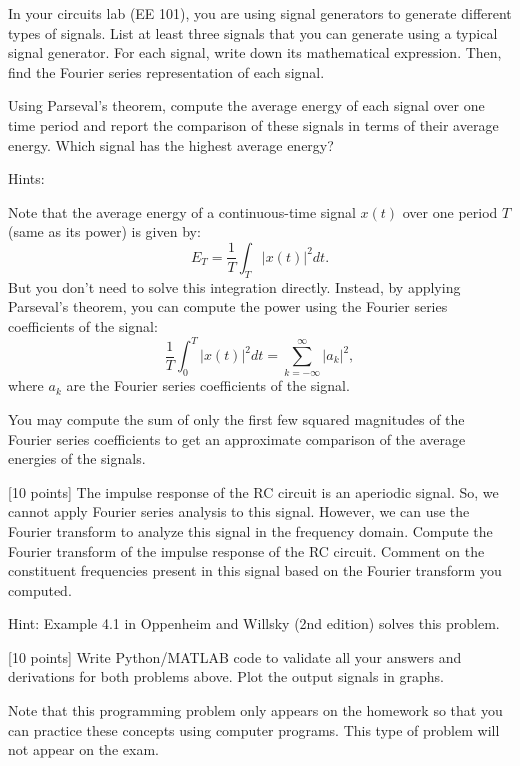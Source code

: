 \documentclass{ee102_pset}
\begin{document}
In your circuits lab (EE 101), you are using signal generators to generate different types of signals. List at least three signals that you can generate using a typical signal generator. For each signal, write down its mathematical expression. Then, find the Fourier series representation of each signal.

Using Parseval's theorem, compute the average energy of each signal over one time period and report the comparison of these signals in terms of their average energy. Which signal has the highest average energy?

{\color{blue}
Hints:

Note that the average energy of a continuous-time signal $x(t)$ over one period $T$ (same as its power) is given by:
\[
E_T = \frac{1}{T} \int_{T} |x(t)|^2 dt.
\]
But you don't need to solve this integration directly. Instead, by applying Parseval's theorem, you can compute the power using the Fourier series coefficients of the signal:
\[
\frac{1}{T} \int_{0}^{T} |x(t)|^2 dt = \sum_{k=-\infty}^{\infty} |a_k|^2,
\]
where $a_k$ are the Fourier series coefficients of the signal.

You may compute the sum of only the first few squared magnitudes of the Fourier series coefficients to get an approximate comparison of the average energies of the signals. 
}

[10 points] The impulse response of the RC circuit is an aperiodic signal. So, we cannot apply Fourier series analysis to this signal. However, we can use the Fourier transform to analyze this signal in the frequency domain. Compute the Fourier transform of the impulse response of the RC circuit. Comment on the constituent frequencies present in this signal based on the Fourier transform you computed.

{\color{blue} Hint: Example 4.1 in Oppenheim and Willsky (2nd edition) solves this problem.}

[10 points] Write Python/MATLAB code to validate all your answers and derivations for both problems above. Plot the output signals in graphs.  

{\color{blue}Note that this programming problem only appears on the homework so that you can practice these concepts using computer programs. This type of problem will not appear on the exam.}
\end{document}
